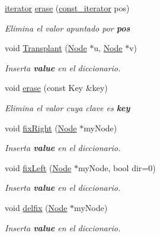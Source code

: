 \begin{Indent}
\begin{DoxyCompactItemize}
\item 
\hyperlink{classaed2_1_1map_1_1iterator}{iterator} \hyperlink{classaed2_1_1map_ad8e796bf9c9c558e5ce6b61e116253fe_ad8e796bf9c9c558e5ce6b61e116253fe}{erase} (\hyperlink{classaed2_1_1map_1_1const__iterator}{const\+\_\+iterator} pos)
\begin{DoxyCompactList}\small\item\em Elimina el valor apuntado por {\bfseries pos} \end{DoxyCompactList}\item 
void \hyperlink{classaed2_1_1map_a6c9fb4a85c0e8d2de5dcbdbc0d695be5_a6c9fb4a85c0e8d2de5dcbdbc0d695be5}{Transplant} (\hyperlink{structaed2_1_1map_1_1Node}{Node} $\ast$u, \hyperlink{structaed2_1_1map_1_1Node}{Node} $\ast$v)
\begin{DoxyCompactList}\small\item\em Inserta {\bfseries value} en el diccionario. \end{DoxyCompactList}\item 
void \hyperlink{classaed2_1_1map_a2ffadb42cd5f0bc7b3752ff159b75334_a2ffadb42cd5f0bc7b3752ff159b75334}{erase} (const Key \&key)
\begin{DoxyCompactList}\small\item\em Elimina el valor cuya clave es {\bfseries key} \end{DoxyCompactList}\item 
void \hyperlink{classaed2_1_1map_ae908761d06411046290cf49a5e0618bd_ae908761d06411046290cf49a5e0618bd}{fix\+Right} (\hyperlink{structaed2_1_1map_1_1Node}{Node} $\ast$my\+Node)
\begin{DoxyCompactList}\small\item\em Inserta {\bfseries value} en el diccionario. \end{DoxyCompactList}\item 
void \hyperlink{classaed2_1_1map_ae69c26a9d27f538124cd827646e56feb_ae69c26a9d27f538124cd827646e56feb}{fix\+Left} (\hyperlink{structaed2_1_1map_1_1Node}{Node} $\ast$my\+Node, bool dir=0)
\begin{DoxyCompactList}\small\item\em Inserta {\bfseries value} en el diccionario. \end{DoxyCompactList}\item 
void \hyperlink{classaed2_1_1map_a056322ff63d37b43d042ffa0378c9fd2_a056322ff63d37b43d042ffa0378c9fd2}{delfix} (\hyperlink{structaed2_1_1map_1_1Node}{Node} $\ast$my\+Node)
\begin{DoxyCompactList}\small\item\em Inserta {\bfseries value} en el diccionario. \end{DoxyCompactList}\item 

\end{DoxyCompactItemize}
\end{Indent}
